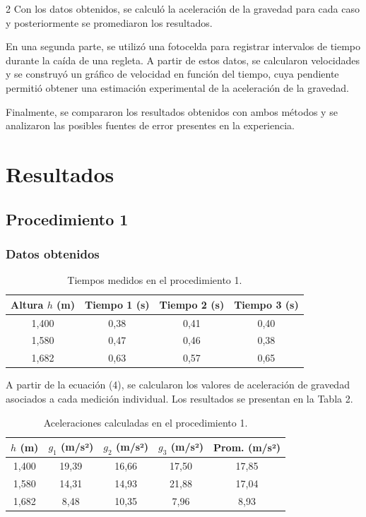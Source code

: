 \documentclass[11pt,letterpaper]{article}
\begin{document}
\begin{multicols}{2}
Con los datos obtenidos, se calculó la aceleración de la gravedad para cada caso y posteriormente se promediaron los resultados.

En una segunda parte, se utilizó una fotocelda para registrar intervalos de tiempo durante la caída de una regleta. A partir de estos datos, se calcularon velocidades y se construyó un gráfico de velocidad en función del tiempo, cuya pendiente permitió obtener una estimación experimental de la aceleración de la gravedad.

Finalmente, se compararon los resultados obtenidos con ambos métodos y se analizaron las posibles fuentes de error presentes en la experiencia.

\section{Resultados}

\subsection{Procedimiento 1}

\subsubsection{Datos obtenidos}

\begin{table}[H]
\centering
\small
\begin{tabular}{cccc}
\toprule
Altura $h$ (m) & Tiempo 1 (s) & Tiempo 2 (s) & Tiempo 3 (s) \\
\midrule
1,400 & 0,38 & 0,41 & 0,40 \\
1,580 & 0,47 & 0,46 & 0,38 \\
1,682 & 0,63 & 0,57 & 0,65 \\
\bottomrule
\end{tabular}
\caption{Tiempos medidos en el procedimiento 1.}
\end{table}

A partir de la ecuación (4), se calcularon los valores de aceleración de gravedad asociados a cada medición individual. Los resultados se presentan en la Tabla 2.

\begin{table}[H]
\centering
\footnotesize
\begin{tabular}{ccccc}
\toprule
$h$ (m) & $g_1$ (m/s²) & $g_2$ (m/s²) & $g_3$ (m/s²) & Prom. (m/s²) \\
\midrule
1,400 & 19,39 & 16,66 & 17,50 & 17,85 \\
1,580 & 14,31 & 14,93 & 21,88 & 17,04 \\
1,682 & 8,48 & 10,35 & 7,96 & 8,93 \\
\bottomrule
\end{tabular}
\caption{Aceleraciones calculadas en el procedimiento 1.}
\end{table}


\end{multicols}
\end{document}
